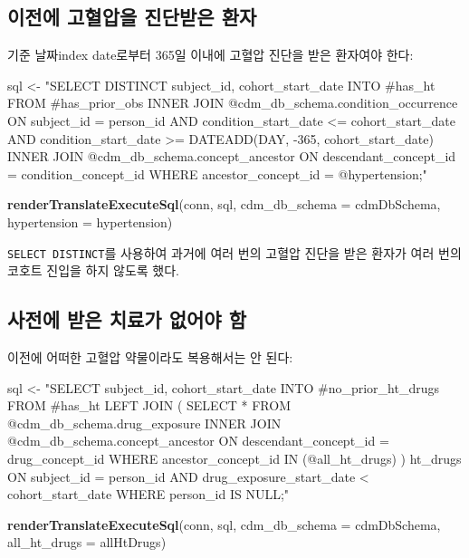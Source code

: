 \documentclass[10.5pt]{book}
\newenvironment{Shaded}{\begin{snugshade}}{\end{snugshade}}
\newcommand{\KeywordTok}[1]{\textcolor[rgb]{0.13,0.29,0.53}{\textbf{#1}}}
\newcommand{\DataTypeTok}[1]{\textcolor[rgb]{0.13,0.29,0.53}{#1}}
\newcommand{\StringTok}[1]{\textcolor[rgb]{0.31,0.60,0.02}{#1}}
\newcommand{\NormalTok}[1]{#1}
\theoremstyle{definition}
\theoremstyle{definition}
\theoremstyle{definition}
\theoremstyle{remark}
\begin{document}
\subsection{이전에 고혈압을 진단받은 환자}\label{---}

기준 날짜index date로부터 365일 이내에 고혈압 진단을 받은 환자여야 한다:

\begin{Shaded}
\begin{Highlighting}[]
\NormalTok{sql <-}\StringTok{ "SELECT DISTINCT subject_id,}
\StringTok{  cohort_start_date}
\StringTok{INTO #has_ht}
\StringTok{FROM #has_prior_obs}
\StringTok{INNER JOIN @cdm_db_schema.condition_occurrence}
\StringTok{  ON subject_id = person_id}
\StringTok{    AND condition_start_date <= cohort_start_date}
\StringTok{    AND condition_start_date >= DATEADD(DAY, -365, cohort_start_date)}
\StringTok{INNER JOIN @cdm_db_schema.concept_ancestor}
\StringTok{  ON descendant_concept_id = condition_concept_id}
\StringTok{WHERE ancestor_concept_id = @hypertension;"}

\KeywordTok{renderTranslateExecuteSql}\NormalTok{(conn,}
\NormalTok{                          sql,}
                          \DataTypeTok{cdm_db_schema =}\NormalTok{ cdmDbSchema,}
                          \DataTypeTok{hypertension =}\NormalTok{ hypertension)}
\end{Highlighting}
\end{Shaded}

\texttt{SELECT\ DISTINCT}를 사용하여 과거에 여러 번의 고혈압 진단을 받은
환자가 여러 번의 코호트 진입을 하지 않도록 했다.

\subsection{사전에 받은 치료가 없어야 함}\label{----}

이전에 어떠한 고혈압 약물이라도 복용해서는 안 된다:

\begin{Shaded}
\begin{Highlighting}[]
\NormalTok{sql <-}\StringTok{ "SELECT subject_id,}
\StringTok{  cohort_start_date}
\StringTok{INTO #no_prior_ht_drugs}
\StringTok{FROM #has_ht}
\StringTok{LEFT JOIN (}
\StringTok{  SELECT *}
\StringTok{  FROM @cdm_db_schema.drug_exposure}
\StringTok{  INNER JOIN @cdm_db_schema.concept_ancestor}
\StringTok{    ON descendant_concept_id = drug_concept_id}
\StringTok{  WHERE ancestor_concept_id IN (@all_ht_drugs)}
\StringTok{) ht_drugs}
\StringTok{  ON subject_id = person_id}
\StringTok{    AND drug_exposure_start_date < cohort_start_date}
\StringTok{WHERE person_id IS NULL;"}

\KeywordTok{renderTranslateExecuteSql}\NormalTok{(conn,}
\NormalTok{                          sql,}
                          \DataTypeTok{cdm_db_schema =}\NormalTok{ cdmDbSchema,}
                          \DataTypeTok{all_ht_drugs =}\NormalTok{ allHtDrugs)}
\end{Highlighting}
\end{Shaded}
\end{document}
